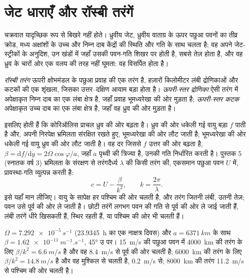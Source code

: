 \section{जेट धाराएँ और रॉस्बी तरंगें}\label{sec:b2:weather-systems:rossby}

चक्रवात यादृच्छिक रूप से बिखरे नहीं होते। ध्रुवीय जेट, ध्रुवीय वाताग्र के ऊपर पछुआ पवनों का तीव्र
क्रोड, मध्य अक्षांशों के उच्च और निम्न दाब केंद्रों की स्थिति और गति के साथ चलता है; वह अपने जेट-स्ट्रीकों के अनुदिश,
उन खंडों में जहाँ उसकी पवन-गति शिखर पर होती है, सबसे तेज़ होता है, और वह ध्रुव के चारों ओर एक वलय की तरह
नहीं घूमता: वह विसर्पित होता है।

\begin{definition}\label{def:b2:weather-systems:rossby}
\emph{रॉस्बी तरंग} ऊपरी क्षोभमंडल के पछुआ प्रवाह की एक तरंग है,
हज़ारों किलोमीटर लंबी द्रोणिकाओं और कटकों की एक शृंखला, जिसका उत्तर--दक्षिण आयाम बड़ा होता है।
\emph{ऊपरी-स्तर द्रोणिका} ऐसी तरंग में अपेक्षाकृत निम्न दाब का एक
लंबा क्षेत्र है, जहाँ प्रवाह भूमध्यरेखा की ओर मुड़ता है; \emph{ऊपरी-स्तर
कटक} अपेक्षाकृत उच्च दाब का एक लंबा क्षेत्र है, जहाँ वह
ध्रुव की ओर मुड़ता है।
\end{definition}

 इसलिए होती हैं कि कोरिऑलिस प्राचल ध्रुव की ओर बढ़ता है। ध्रुव की ओर धकेली गई वायु
बड़ा $f$ पाती है और, अपनी निरपेक्ष भ्रमिलता संरक्षित रखते हुए, भूमध्यरेखा की ओर लौट जाती है; भूमध्यरेखा की ओर
धकेली गई वायु ध्रुव की ओर लौट जाती है। वह दर जिससे $f$ उत्तर की ओर बढ़ता है,
$\beta = \mathrm{d}f/\mathrm{d}y = 2\Omega\cos\varphi/a$, जहाँ $a$ पृथ्वी की त्रिज्या है, उनकी
गति निर्धारित करती है। पुस्तक 5 (स्नातक वर्ष 3) भ्रमिलता के संरक्षण से तरंगदैर्ध्य $\lambda$ की
किसी तरंग की, एकसमान पछुआ पवन $U$ में, प्रावस्था-गति व्युत्पन्न करती है:
\[
  c = U - \frac{\beta}{k^2}, \qquad k = \frac{2\pi}{\lambda} .
\]
इसे यहाँ मान लीजिए। वायु के सापेक्ष हर  पश्चिम की ओर चलती है, और तरंग जितनी लंबी, उतनी
तेज़; पवन उसे पूर्व की ओर ले जाती है। छोटी तरंगें लगभग पवन की गति से पूर्व की ओर ले जाई जाती हैं,
लंबी तरंगें धीरे खिसकती हैं, स्थिर रहती हैं, या पश्चिम की ओर भी चलती हैं।

\begin{example}[45° उ पर तीन तरंगें]\label{ex:b2:weather-systems:rossby}
$\Omega = \qty{7.292e-5}{s^{-1}}$ (\qty{23.9345}{h} का एक नाक्षत्र दिवस) और $a =
\qty{6371}{km}$ के साथ $\beta = \qty{1.62e-11}{m^{-1}.s^{-1}}$, \ang{45} उ पर। \qty{15}{m/s} की
पछुआ पवन में \qty{4000}{km} की तरंग के लिए $\beta/k^2 = \qty{6.6}{m/s}$ है और वह
\qty{8.4}{m/s} से पूर्व की ओर चलती है; \qty{6000}{km} की तरंग के लिए $\beta/k^2 = \qty{14.8}{m/s}$ है और वह मुश्किल से चलती है,
\qty{0.2}{m/s} से; \qty{8000}{km} की तरंग \qty{11.2}{m/s} से पश्चिम की ओर चलती है।
\end{example}

